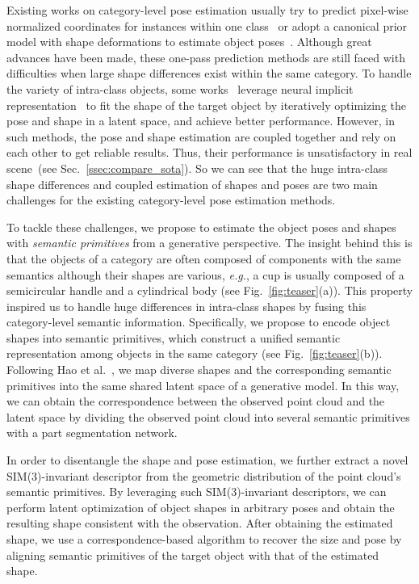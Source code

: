 \documentclass{article}
\begin{document}
Existing works on category-level pose estimation usually 
try to predict pixel-wise normalized coordinates for instances within one class~\cite{NOCS} or adopt a canonical prior model with shape deformations to estimate object poses~\cite{SPD, SGPA}.
Although great advances have been made, these one-pass prediction methods are still faced with difficulties when large shape differences exist within the same category.
To handle the variety of intra-class objects, some works~\cite{shan2021ellipsdf,deng2022icaps} leverage neural implicit representation~\cite{park2019deepsdf} to fit the shape of the target object by iteratively optimizing the pose and shape in a latent space, and achieve better performance.
However, in such methods, the pose and shape estimation are coupled together and rely on each other to get reliable results. Thus, their performance  is unsatisfactory in real scene~(see Sec.~\ref{ssec:compare_sota}).
So we can see that the huge intra-class shape differences and coupled estimation of shapes and poses are two main challenges for the existing category-level pose estimation methods. 

To tackle these challenges, we propose to estimate the object poses and shapes with \textit{semantic primitives} from a generative perspective.
The insight behind this is that the objects of a category are often composed of components with the same semantics although their shapes are various, \emph{e.g.}, a cup is usually composed of a semicircular handle and a cylindrical body (see Fig.~\ref{fig:teaser}(a)). 
This property inspired us to handle huge differences in intra-class shapes by fusing this category-level semantic information. Specifically, 
we propose to encode object shapes into semantic primitives, which construct a unified semantic representation among objects in the same category (see Fig.~\ref{fig:teaser}(b)).
Following Hao et al.~\cite{DualSDF}, we map diverse shapes and the corresponding semantic primitives into the same shared latent space of a generative model.
In this way, we can obtain the correspondence between the observed point cloud and the latent space by dividing the observed point cloud into several semantic primitives with a part segmentation network.

In order to disentangle the shape and pose estimation, we further
extract a novel SIM(3)-invariant descriptor from the geometric distribution of the point cloud's semantic primitives. 
By leveraging such SIM(3)-invariant descriptors, we can perform latent optimization of object shapes in arbitrary poses and obtain the resulting shape consistent with the observation.
After obtaining the estimated shape, we use a correspondence-based algorithm to recover the size and pose by aligning semantic primitives of the target object with that of the estimated shape.
\end{document}

